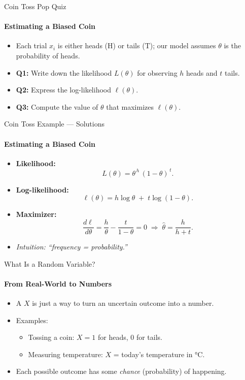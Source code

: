 {
\begin{frame}{Coin Toss Pop Quiz}
  \framesubtitle{Estimating a Biased Coin}
  \begin{itemize}
    \item Each trial \(x_i\) is either heads (\(\mathrm{H}\)) or tails (\(\mathrm{T}\)); our model assumes \(\theta\) is the probability of heads.
    \item \textbf{Q1:} Write down the likelihood \(L(\theta)\) for observing \(h\) heads and \(t\) tails.
    \item \textbf{Q2:} Express the log-likelihood \(\ell(\theta)\).
    \item \textbf{Q3:} Compute the value of \(\theta\) that maximizes \(\ell(\theta)\).
  \end{itemize}
\end{frame}

\begin{frame}{Coin Toss Example — Solutions}
  \framesubtitle{Estimating a Biased Coin}
  \begin{itemize}
    \item \textbf{Likelihood:}
          \[
            L(\theta)
            = \theta^{\,h}\,(1-\theta)^{\,t}.
          \]
    \item \textbf{Log-likelihood:}
          \[
            \ell(\theta)
            = h\log\theta \;+\; t\log(1-\theta).
          \]
    \item \textbf{Maximizer:}
          \[
            \frac{d\ell}{d\theta}
            = \frac{h}{\theta} - \frac{t}{1-\theta} = 0
            \;\Longrightarrow\;
            \hat\theta = \frac{h}{h+t}.
          \]
    \item \emph{Intuition: “frequency = probability.”}
  \end{itemize}
\end{frame}
}

\begin{frame}{What Is a Random Variable?}
  \framesubtitle{From Real-World to Numbers}
  \begin{itemize}
    \item A  $X$ is just a way to turn an uncertain outcome into a number.
    \item Examples:
          \begin{itemize}
            \item Tossing a coin: $X=1$ for heads, $0$ for tails.
            \item Measuring temperature: $X$ = today's temperature in °C.
          \end{itemize}
    \item Each possible outcome has some \emph{chance} (probability) of happening.
  \end{itemize}
\end{frame}

